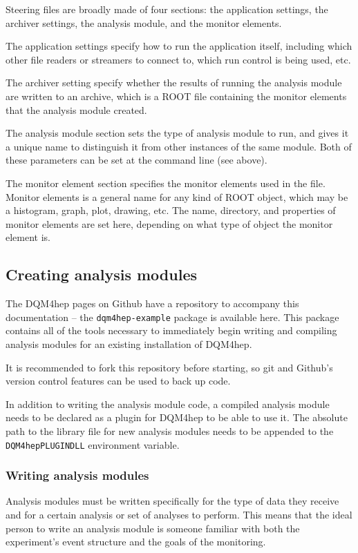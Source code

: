 Steering files are broadly made of four sections: the application settings, the archiver settings, the analysis module, and the monitor elements.

The application settings specify how to run the application itself, including which other file readers or streamers to connect to, which run control is being used, etc. 

The archiver setting specify whether the results of running the analysis module are written to an archive, which is a ROOT file containing the monitor elements that the analysis module created.

The analysis module section sets the type of analysis module to run, and gives it a unique name to distinguish it from other instances of the same module. Both of these parameters can be set at the command line (see above).

The monitor element section specifies the monitor elements used in the file. Monitor elements is a general name for any kind of ROOT object, which may be a histogram, graph, plot, drawing, etc. The name, directory, and properties of monitor elements are set here, depending on what type of object the monitor element is.

\subsection{Creating analysis modules}
The \acrshort{DQM4hep} pages on Github have a repository to accompany this documentation – the \texttt{dqm4hep-example} package is available here. This package contains all of the tools necessary to immediately begin writing and compiling analysis modules for an existing installation of \acrshort{DQM4hep}. 

It is recommended to fork this repository before starting, so git and Github's version control features can be used to back up code.

In addition to writing the analysis module code, a compiled analysis module needs to be declared as a plugin for \acrshort{DQM4hep} to be able to use it. The absolute path to the library file for new analysis modules needs to be appended to the \texttt{DQM4hep\textunderscore PLUGIN\textunderscore DLL} environment variable. 

\subsubsection{Writing analysis modules}
Analysis modules must be written specifically for the type of data they receive and for a certain analysis or set of analyses to perform. This means that the ideal person to write an analysis module is someone familiar with both the experiment's event structure and the goals of the monitoring.

